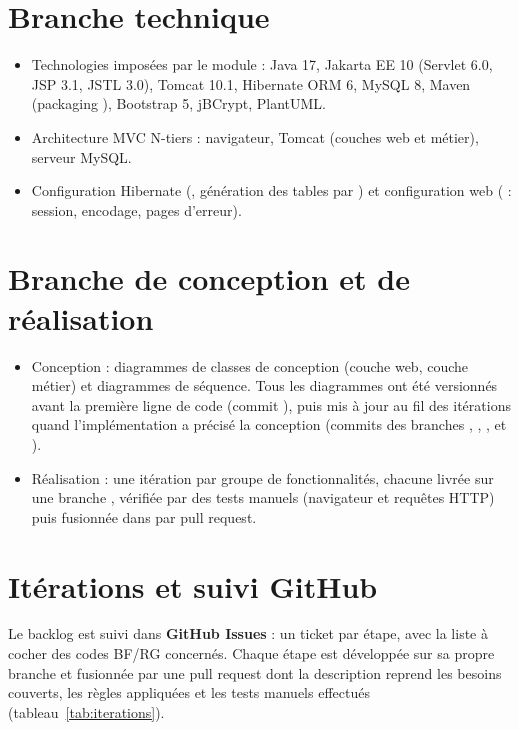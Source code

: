 \section{Branche technique}

\begin{itemize}
  \item Technologies imposées par le module : Java 17, Jakarta EE 10 (Servlet 6.0, JSP 3.1, JSTL 3.0), Tomcat 10.1,
        Hibernate ORM 6, MySQL 8, Maven (packaging ), Bootstrap 5, jBCrypt, PlantUML.
  \item Architecture MVC N-tiers : navigateur, Tomcat (couches web et métier), serveur MySQL.
  \item Configuration Hibernate (, génération des tables par ) et
        configuration web ( : session, encodage, pages d'erreur).
\end{itemize}

\section{Branche de conception et de réalisation}

\begin{itemize}
  \item Conception : diagrammes de classes de conception (couche web, couche métier) et diagrammes de séquence.
        Tous les diagrammes ont été versionnés avant la première ligne de code (commit ), puis mis à jour
        au fil des itérations quand l'implémentation a précisé la conception (commits  des branches
        , , ,  et
        ).
  \item Réalisation : une itération par groupe de fonctionnalités, chacune livrée sur une branche ,
        vérifiée par des tests manuels (navigateur et requêtes HTTP) puis fusionnée dans  par pull request.
\end{itemize}

\section{Itérations et suivi GitHub}

Le backlog est suivi dans \textbf{GitHub Issues} : un ticket par étape, avec la liste à cocher des codes BF/RG
concernés. Chaque étape est développée sur sa propre branche et fusionnée par une pull request dont la
description reprend les besoins couverts, les règles appliquées et les tests manuels effectués
(tableau~\ref{tab:iterations}).

